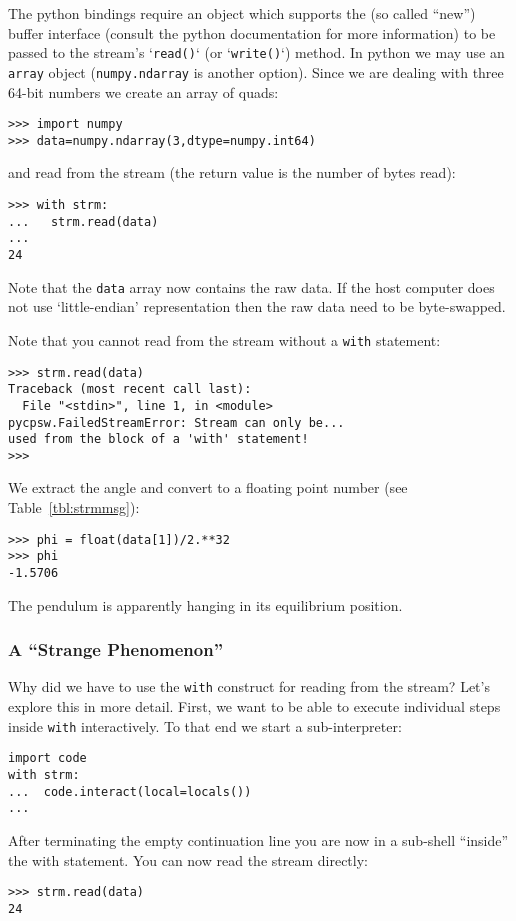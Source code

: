 \documentclass[10pt]{article}
\newcommand{\py}        {python}
\newcommand{\pyt}       {python}
\newcommand{\cod}[1] {{\tt#1}}
\begin{document}
The \py{} bindings require an object which supports the (so called ``new'') buffer
interface (consult the \py{} documentation for more information) to be passed to
the stream's `\cod{read()}` (or `\cod{write()}`) method.
In \pyt{} we may use an \cod{array} object (\cod{numpy.ndarray} is another option).
Since we are dealing with three 64-bit numbers we create an array of quads:
\begin{verbatim}
>>> import numpy
>>> data=numpy.ndarray(3,dtype=numpy.int64)
\end{verbatim}
and read from the stream (the return value is the number of bytes read):
\begin{verbatim}
>>> with strm:
...   strm.read(data)
...
24
\end{verbatim}
Note that the \cod{data} array now contains the raw data. If the host computer does not
use `little-endian' representation then the raw data need to be byte-swapped.

Note that you cannot read from the stream without a \cod{with} statement:
\begin{verbatim}
>>> strm.read(data)
Traceback (most recent call last):
  File "<stdin>", line 1, in <module>
pycpsw.FailedStreamError: Stream can only be...
used from the block of a 'with' statement!
>>> 
\end{verbatim}

We extract the angle and convert to a floating point number (see
Table~\ref{tbl:strmmsg}):
\begin{verbatim}
>>> phi = float(data[1])/2.**32
>>> phi
-1.5706
\end{verbatim}
The pendulum is apparently hanging in its equilibrium position.

\subsubsection{A ``Strange Phenomenon''}
Why did we have to use the \cod{with} construct for reading from the stream?
Let's explore this in more detail. First, we want to be able to execute
individual steps inside \cod{with} interactively. To that end we start a
sub-interpreter:
\begin{verbatim}
import code
with strm:
...  code.interact(local=locals())
...
\end{verbatim}
After terminating the empty continuation line you are now in a sub-shell
``inside'' the with statement. You can now read the stream directly:
\begin{verbatim}
>>> strm.read(data)
24
\end{verbatim}
\end{document}
